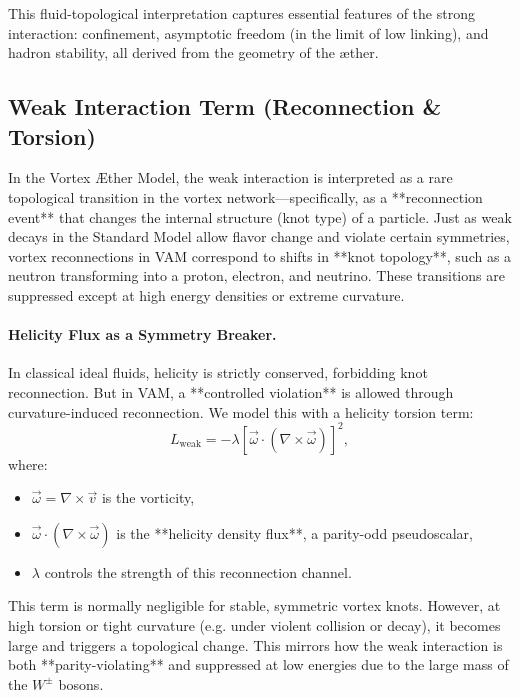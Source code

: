 \medskip
This fluid-topological interpretation captures essential features of the strong interaction: confinement, asymptotic freedom (in the limit of low linking), and hadron stability, all derived from the geometry of the æther.
\subsection{Weak Interaction Term (Reconnection \& Torsion)}

In the Vortex \AE ther Model, the weak interaction is interpreted as a rare topological transition in the vortex network—specifically, as a **reconnection event** that changes the internal structure (knot type) of a particle. Just as weak decays in the Standard Model allow flavor change and violate certain symmetries, vortex reconnections in VAM correspond to shifts in **knot topology**, such as a neutron transforming into a proton, electron, and neutrino. These transitions are suppressed except at high energy densities or extreme curvature.

\vspace{0.5em}
\paragraph{Helicity Flux as a Symmetry Breaker.}
In classical ideal fluids, helicity is strictly conserved, forbidding knot reconnection. But in VAM, a **controlled violation** is allowed through curvature-induced reconnection. We model this with a helicity torsion term:
\begin{equation}
    L_{\text{weak}} = -\lambda \left[ \vec{\omega} \cdot (\nabla \times \vec{\omega}) \right]^2,
    \label{eq:weak-helicity-term}
\end{equation}
where:
\begin{itemize}
    \item \( \vec{\omega} = \nabla \times \vec{v} \) is the vorticity,
    \item \( \vec{\omega} \cdot (\nabla \times \vec{\omega}) \) is the **helicity density flux**, a parity-odd pseudoscalar,
    \item \( \lambda \) controls the strength of this reconnection channel.
\end{itemize}

This term is normally negligible for stable, symmetric vortex knots. However, at high torsion or tight curvature (e.g. under violent collision or decay), it becomes large and triggers a topological change. This mirrors how the weak interaction is both **parity-violating** and suppressed at low energies due to the large mass of the \( W^\pm \) bosons.

